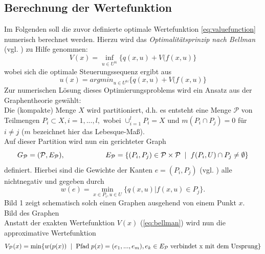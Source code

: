 \documentclass[12pt,a4paper,twoside]{article}
\begin{document}
	\subsection{Berechnung der Wertefunktion}
	\label{sec:valuef}
	Im Folgenden soll die zuvor definierte optimale Wertefunktion \ref{eq:valuefunction} numerisch berechnet werden. Hierzu wird das \textit{Optimalitätsprinzip nach Bellman} (vgl. \cite{deuflhard2008}) zu Hilfe genommen:
	\begin{equation}
		\label{eq:bellman}
		V(x)=\inf_{u\in U^{\mathds{N}}}\{q(x,u)+V(f(x,u)\}
	\end{equation}
	wobei sich die optimale Steuerungssequenz ergibt aus
	\begin{equation}
		u(x)=argmin_{u\in U^{\mathds{N}}}\{q(x,u)+V(f(x,u)\}
	\end{equation}
	Zur numerischen Lösung dieses Optimierungsproblems wird ein Ansatz aus der Graphentheorie gewählt: \\
	Die (kompakte) Menge $X$ wird partitioniert, d.h. es entsteht eine Menge $\mathcal{P}$
	von Teilmengen $P_i\subset X, i=1,...,l,$ wobei $\cup_{i=1}^lP_i=X$ und $m(P_i \cap P_j)=0$ für $i\neq j$ ($m$ 
	bezeichnet hier das Lebesque-Maß). \\
	Auf dieser Partition wird nun ein gerichteter Graph 
	\begin{equation*}
		G_\mathcal{P}=(\mathcal{P},E_\mathcal{P}), \hspace{2cm} E_\mathcal{P}=\{(P_i,P_j)\in \mathcal{P}\times \mathcal{P} \hspace{2mm}|\hspace{2mm}f(P_i,U)\cap P_j\neq \emptyset\}
	\end{equation*}
	definiert. Hierbei sind die Gewichte der Kanten $e=(P_i,P_j)$ (vgl. \cite{Junge2004}) alle nichtnegativ und 
	gegeben durch
	\begin{equation*}
		w(e)=\min_{x\in P_i, u\in U}\{q(x,u)|f(x,u)\in P_j\}.
	\end{equation*}
	Bild 1 zeigt schematisch solch einen Graphen ausgehend von einem Punkt $x$.
	\vspace{1cm}
	\\
	Bild des Graphen
	\vspace{1cm}
	\\
	Anstatt der exakten Wertefunktion $V(x)$ (\ref{eq:bellman}) wird nun die approximative Wertefunktion
	\begin{equation*}
		V_\mathcal{P}(x)=\min\{w(p(x)) \hspace{2mm}|\hspace{2mm} \text{Pfad}\hspace{1mm} p(x)=(e_1,...,e_m), e_k\in E_\mathcal{P} \hspace{1mm}\text{verbindet x mit dem Ursprung}\}
	\end{equation*}
\end{document}
